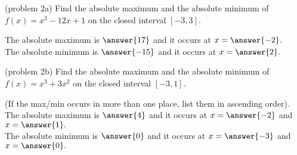 \documentclass[handout]{ximera}
\begin{document}
\begin{problem}(problem 2a)
Find the absolute maximum and the absolute minimum of $f(x) = x^3 - 12x + 1$
on the closed interval $[-3, 3]$.

The absolute maximum is $\answer{17}$ and it occurs at $x = \answer{-2}.$\\
The absolute minimum is $\answer{-15}$ and it occurs at $x = \answer{2}.$ 
\end{problem}

\begin{problem}(problem 2b)
Find the absolute maximum and the absolute minimum of $f(x) = x^3 + 3x^2$
on the closed interval $[-3, 1]$.

(If the max/min occurs in more than one place, list them in 
ascending order).\\
The absolute maximum is $\answer{4}$ and it occurs at $x = \answer{-2}$
and $x=\answer{1}.$
\\
The absolute minimum is $\answer{0}$ and it occurs at $x = \answer{-3}$
and $x=\answer{0}.$ 
\end{problem}
\end{document}

